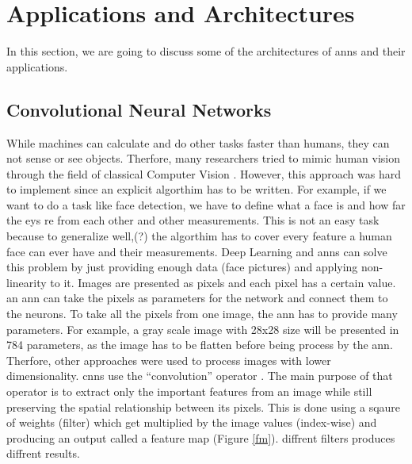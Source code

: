 \documentclass[runningheads]{llncs}
\begin{document}
\section{Applications and Architectures}

In this section, we are going to discuss some of the architectures of \gls{anns}
and their applications.

\subsection{Convolutional Neural Networks}

While machines can calculate and do other tasks faster than humans,
they can not sense or see objects. Therfore, many researchers
tried to mimic human vision through the field of classical Computer Vision \cite{hoffmann1992computer}.
However, this approach was hard to implement since an explicit algorthim 
has to be written. For example, if we want to do a task like
face detection, we have to define what a face is and how
far the eys re from each other and other measurements. This is not 
an easy task because to generalize well,(?) the algorthim has to 
cover every feature a human face can ever have and their measurements. Deep Learning 
and \gls{anns} can solve this problem by just providing enough data
(face pictures) and applying non-linearity to it.
Images are presented as pixels and each pixel has a certain value.
an \gls{ann} can take the pixels as parameters for the network 
and connect them to the neurons. To take all the pixels from
one image, the \gls{ann} has to provide many parameters. For example,
a gray scale image with 28x28 size will be presented in 784 parameters, 
as the image has to be flatten before being process by the \gls{ann}.
Therfore, other approaches were used to process images with lower dimensionality.
\gls{cnns} use the “convolution” operator \cite{lecun1998gradient}. The main purpose of that 
operator is to extract only the important features from an image while
still preserving the spatial relationship between its pixels. This is 
done using a sqaure of weights (filter) which
get multiplied by the image values (index-wise) and producing an output called a feature map (Figure \ref{fm}).
diffrent filters produces diffrent results.
\end{document}
